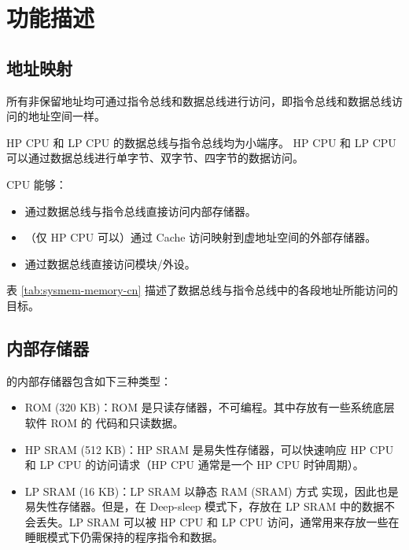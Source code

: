 \documentclass[main\_\_CN.tex]{subfiles}
\begin{document}
\section{功能描述}

\subsection{地址映射}

所有非保留地址均可通过指令总线和数据总线进行访问，即指令总线和数据总线访问的地址空间一样。

HP CPU 和 LP CPU 的数据总线与指令总线均为小端序。
HP CPU 和 LP CPU 可以通过数据总线进行单字节、双字节、四字节的数据访问。

CPU 能够：
\begin{itemize}
\item 通过数据总线与指令总线直接访问内部存储器。
\item（仅 HP CPU 可以）通过 Cache 访问映射到虚地址空间的外部存储器。
\item 通过数据总线直接访问模块/外设。
\end{itemize}

表 \ref{tab:sysmem-memory-cn} 描述了数据总线与指令总线中的各段地址所能访问的目标。






\subsection{内部存储器}
\label{para:sysmem-internal-memory}

\chipname{} 的内部存储器包含如下三种类型：

\begin{itemize}
    \item ROM (320 KB)：ROM 是只读存储器，不可编程。其中存放有一些系统底层软件 ROM 的 代码和只读数据。
    \item HP SRAM (512 KB)：HP SRAM 是易失性存储器，可以快速响应 HP CPU 和 LP CPU 的访问请求（HP CPU 通常是一个 HP CPU 时钟周期）。
    \item LP SRAM (16 KB)：LP SRAM 以静态 RAM (SRAM) 方式 实现，因此也是易失性存储器。但是，在 Deep-sleep 模式下，存放在 LP SRAM 中的数据不会丢失。LP SRAM 可以被 HP CPU 和 LP CPU 访问，通常用来存放一些在睡眠模式下仍需保持的程序指令和数据。

\end{itemize}
\end{document}
